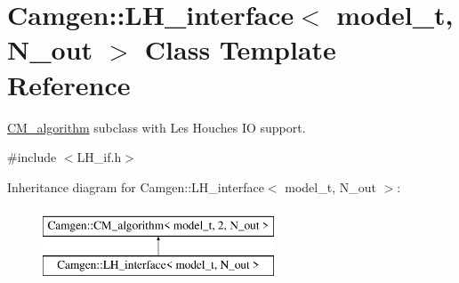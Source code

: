 \hypertarget{a00322}{\section{Camgen\-:\-:L\-H\-\_\-interface$<$ model\-\_\-t, N\-\_\-out $>$ Class Template Reference}
\label{a00322}
}


\hyperlink{a00070}{C\-M\-\_\-algorithm} subclass with Les Houches I\-O support.  




{\ttfamily \#include $<$L\-H\-\_\-if.\-h$>$}

Inheritance diagram for Camgen\-:\-:L\-H\-\_\-interface$<$ model\-\_\-t, N\-\_\-out $>$\-:\begin{figure}[H]
\begin{center}
\leavevmode
\includegraphics[height=2.000000cm]{a00322}
\end{center}
\end{figure}
